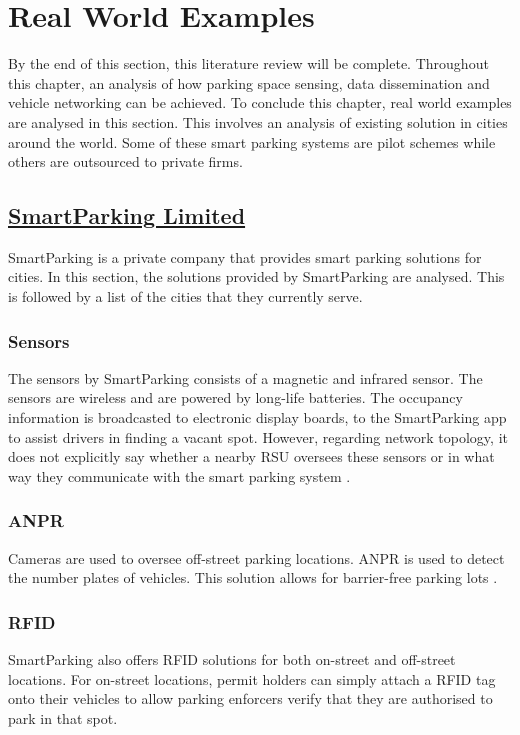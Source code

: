 \pagebreak

\section{Real World Examples}
By the end of this section, this literature review will be complete. Throughout this chapter, an analysis of how parking space sensing, data dissemination and vehicle networking can be achieved. To conclude this chapter, real world examples are analysed in this section. This involves an analysis of existing solution in cities around the world. Some of these smart parking systems are pilot schemes while others are outsourced to private firms.

\subsection*{\underline{SmartParking Limited}}
SmartParking \citep{18} is a private company that provides smart parking solutions for cities. In this section, the solutions provided by SmartParking are analysed. This is followed by a list of the cities that they currently serve.

\subsubsection{Sensors}
The sensors by SmartParking consists of a magnetic and infrared sensor. The sensors are wireless and are powered by long-life batteries. The occupancy information is broadcasted to electronic display boards, to the SmartParking app to assist drivers in finding a vacant spot. However, regarding network topology, it does not explicitly say whether a nearby \ac{RSU} oversees these sensors or in what way they communicate with the smart parking system \citep{2017SensorsSmartParking}.

\subsubsection{ANPR}
Cameras are used to oversee off-street parking locations. \ac{ANPR} is used to detect the number plates of vehicles. This solution allows for barrier-free parking lots \citep{2017ANPRSmartParking}.

\subsubsection{RFID}
SmartParking also offers \ac{RFID} solutions for both on-street and off-street locations. For on-street locations, permit holders can simply attach a \ac{RFID} tag onto their vehicles to allow parking enforcers verify that they are authorised to park in that spot.

